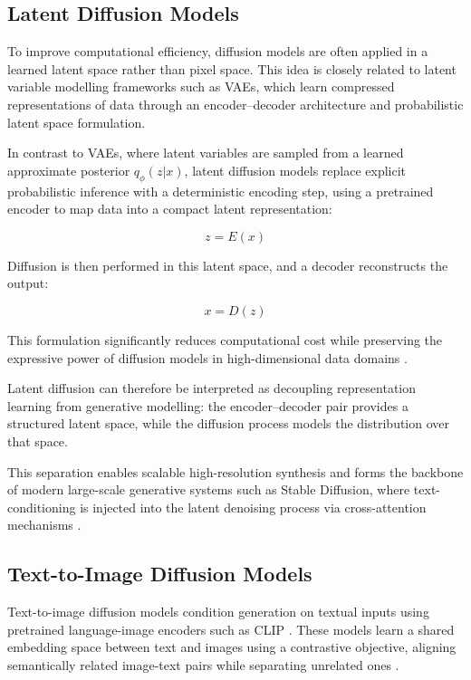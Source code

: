 \documentclass[a4paper,twoside,12pt]{report}
\begin{document}
\subsection{Latent Diffusion Models}

To improve computational efficiency, diffusion models are often applied in a learned latent space rather than pixel space. This idea is closely related to latent variable modelling frameworks such as VAEs, which learn compressed representations of data through an encoder–decoder architecture and probabilistic latent space formulation.

In contrast to VAEs, where latent variables are sampled from a learned approximate posterior \(q_\phi(z|x)\), latent diffusion models replace explicit probabilistic inference with a deterministic encoding step, using a pretrained encoder to map data into a compact latent representation:

\begin{equation}
z = E(x)
\end{equation}

Diffusion is then performed in this latent space, and a decoder reconstructs the output:

\begin{equation}
x = D(z)
\end{equation}

This formulation significantly reduces computational cost while preserving the expressive power of diffusion models in high-dimensional data domains \citep{rombach2022ldm}.

Latent diffusion can therefore be interpreted as decoupling representation learning from generative modelling: the encoder–decoder pair provides a structured latent space, while the diffusion process models the distribution over that space.

This separation enables scalable high-resolution synthesis and forms the backbone of modern large-scale generative systems such as Stable Diffusion, where text-conditioning is injected into the latent denoising process via cross-attention mechanisms \citep{rombach2022ldm}.

\subsection{Text-to-Image Diffusion Models}

Text-to-image diffusion models condition generation on textual inputs using pretrained language-image encoders such as CLIP \citep{radford2021clip}. These models learn a shared embedding space between text and images using a contrastive objective, aligning semantically related image-text pairs while separating unrelated ones \citep{radford2021clip, liu2022composable, saharia2022imagen}.
\end{document}
